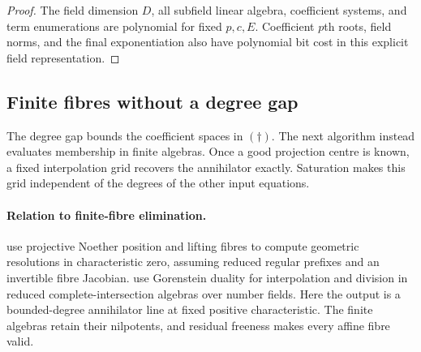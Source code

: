 \begin{proof}
The field dimension \(D\), all subfield linear algebra, coefficient
systems, and term enumerations are polynomial for fixed \(p,c,E\).
Coefficient \(p\)th roots, field norms, and the final exponentiation
also have polynomial bit cost in this explicit field representation.
\end{proof}

\subsection{Finite fibres without a degree gap}

The degree gap bounds the coefficient spaces in \((\dagger)\). The next
algorithm instead evaluates membership in finite algebras. Once a good
projection centre is known, a fixed interpolation grid recovers the
annihilator exactly. Saturation makes this grid independent of the
degrees of the other input equations.

\paragraph{Relation to finite-fibre elimination.}
\citet[Theorem~1, author version p.~6; Definitions~3--4,
pp.~16--17]{sci-gls} use projective Noether position and lifting fibres
to compute geometric resolutions in characteristic zero, assuming reduced
regular prefixes and an invertible fibre Jacobian.
\citet[\S4, author pp.~34--39, especially Propositions~44--46]{sci-hmps}
use Gorenstein duality for interpolation and division in reduced
complete-intersection algebras over number fields. Here the output is
a bounded-degree annihilator line at fixed positive characteristic.
The finite algebras retain their nilpotents, and residual freeness makes
every affine fibre valid.

